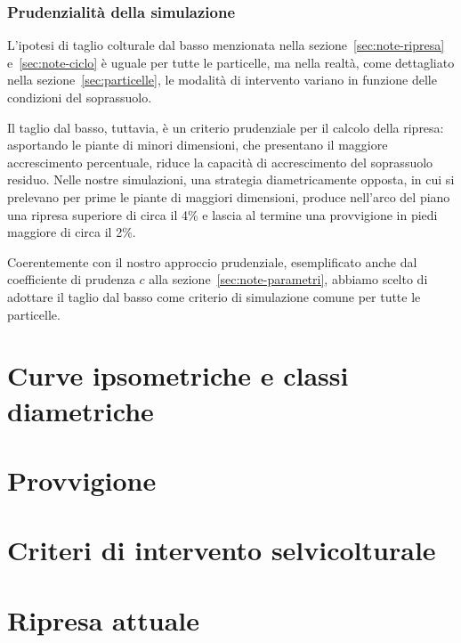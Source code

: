 \documentclass[a4paper,11pt]{article}
\begin{document}
\subsubsection{Prudenzialità della simulazione}

L'ipotesi di taglio colturale dal basso menzionata nella
sezione~\ref{sec:note-ripresa} e~\ref{sec:note-ciclo} è uguale per tutte le
particelle, ma nella realtà, come dettagliato nella
sezione~\ref{sec:particelle}, le modalità di intervento variano in funzione
delle condizioni del soprassuolo.

Il taglio dal basso, tuttavia, è un criterio prudenziale per il calcolo della
ripresa: asportando le piante di minori dimensioni, che presentano il maggiore
accrescimento percentuale, riduce la capacità di accrescimento del soprassuolo
residuo. Nelle nostre simulazioni, una strategia diametricamente opposta, in cui
si prelevano per prime le piante di maggiori dimensioni, produce nell'arco del
piano una ripresa superiore di circa il 4\% e lascia al termine una provvigione
in piedi maggiore di circa il 2\%.

Coerentemente con il nostro approccio prudenziale, esemplificato anche dal
coefficiente di prudenza $c$ alla sezione~\ref{sec:note-parametri}, abbiamo
scelto di adottare il taglio dal basso come criterio di simulazione comune per
tutte le particelle.

\section{Curve ipsometriche e classi diametriche}
\label{sec:ipsometrie}


\setlength{\LTleft}{0.1in}

\section{Provvigione}
\label{sec:provvigione}


\section{Criteri di intervento selvicolturale}
\label{sec:metodo}


\section{Ripresa attuale}
\label{sec:ripresa}

\end{document}
